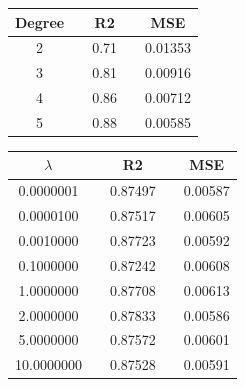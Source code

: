  \begin{center}
 \label{tab:OLS_Degree_R2_MSE}
 \begin{tabularx}{\textwidth}{c X c X c  }
     \hline
     \hline
         Degree && R2 && MSE \\
         \hline
2      && 0.71 && 0.01353 \\ 
3      && 0.81 && 0.00916 \\ 
4      && 0.86 && 0.00712 \\ 
5      && 0.88 && 0.00585 \\ \hline
 \end{tabularx}
 \end{center}
 
 \pagebreak
 \begin{center}
 \label{tab:OLS_lambda_R2_MSE}
 \begin{tabularx}{\textwidth}{c X c X c  }
     \hline
     \hline
         $\lambda$ && R2 && MSE \\
         \hline
 0.0000001  && 0.87497  && 0.00587 \\
0.0000100  && 0.87517  && 0.00605 \\
0.0010000  && 0.87723  && 0.00592 \\
0.1000000  && 0.87242 && 0.00608 \\
1.0000000  && 0.87708 && 0.00613 \\
2.0000000  && 0.87833 && 0.00586 \\
5.0000000  && 0.87572 && 0.00601 \\
10.0000000 && 0.87528 && 0.00591\\ \hline
 \end{tabularx}
 \end{center}


